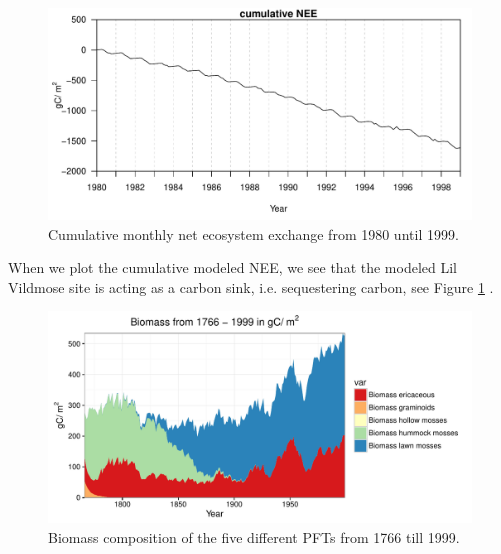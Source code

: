 \documentclass{article}\usepackage[]{graphicx}\usepackage[]{color}
\makeatletter
\def\maxwidth{ %
  \ifdim\Gin@nat@width>\linewidth
    \linewidth
  \else
    \Gin@nat@width
  \fi
}
\newenvironment{knitrout}{}{} %
\makeatother
\begin{document}
\begin{knitrout}
\color{fgcolor}\begin{figure}[H]

{\centering \includegraphics[width=\maxwidth]{figure/plot_cumsum-1} 

}

\caption[Cumulative monthly net ecosystem exchange from 1980 until 1999]{Cumulative monthly net ecosystem exchange from 1980 until 1999.}\label{fig:plot_cumsum}
\end{figure}


\end{knitrout}

When we plot the cumulative modeled NEE, we see that the modeled Lil Vildmose site is acting as a carbon sink, i.e. sequestering carbon, see Figure \ref{fig:plot_cumsum} .

\begin{knitrout}
\color{fgcolor}\begin{figure}[H]

{\centering \includegraphics[width=\maxwidth]{figure/plotbiomass-1} 

}

\caption[Biomass composition of the five different PFTs from 1766 till 1999]{Biomass composition of the five different PFTs from 1766 till 1999.}\label{fig:plotbiomass}
\end{figure}


\end{knitrout}
\end{document}
